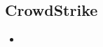 


















\subsection{CrowdStrike}
\begin{frame}{\insertsubsection}
	\begin{fancycolumns}
		\begin{definition}{\insertsubsection}
			\begin{itemize}
				\item 
			\end{itemize}
		\end{definition}
		\nextcolumn
	\end{fancycolumns}
\end{frame}

